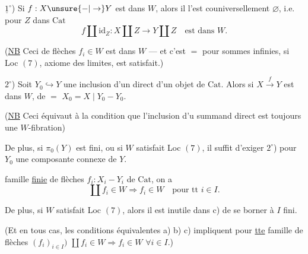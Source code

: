 
$\underline{1}^{\circ}$) Si $f:X\unsure{-|\to}Y$ est dans $W$, alors il l'est couniversellement  $\varnothing$, i.e. pour  $Z$ dans $\mathrm{Cat}$
\[
 f\amalg\mathrm{id}_Z:X\amalg Z\longrightarrow Y\amalg Z\quad\text{est dans }W.
\]

(\uline{NB} Ceci   de flèches $f_i\in W$ est dans $W$ --- et c'est $=$ pour sommes infinies, si Loc $(7)$, axiome des limites, est satisfait.)

$2^\circ$) Soit $Y_0\hookrightarrow Y$ une inclusion d'un  direct d'un objet de $\mathrm{Cat}$. Alors si $X\xrightarrow{f}Y$ est dans $W$, de $=$ $X_0=X\mid Y_0-Y_0$.

(\uline{NB} Ceci équivaut à la condition que l'inclusion d'u summand direct  est toujours une $W$-fibration)

De plus, si $\pi_0(Y)$ est fini, ou si $W$ satisfait Loc $(7)$, il suffit  d'exiger $2^\circ$) pour $Y_0$ une composante connexe de $Y$.

   famille \uline{finie}  de flèches  $f_i:X_i-Y_i$ de $\mathrm{Cat}$,  on a
\[
 \coprod f_i\in W\Longrightarrow f_i\in W\quad\text{pour tt }i\in I.
\]

De plus, si $W$ satisfait Loc $(7)$, alors il est inutile dans c) de se borner à $I$ fini.

(Et en tous cas, les conditions équivalentes a) b) c) impliquent pour \uline{tte} famille de flèches $(f_i)_{i\in I})$\unsure{;|,}  $\coprod f_i\in W\Rightarrow f_i\in W$ $\forall i\in I$.)
